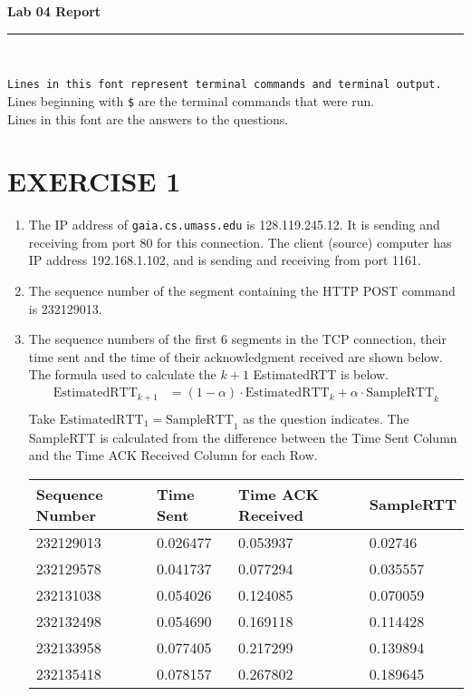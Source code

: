 \documentclass[a4paper,11pt]{article}
\newcommand{\ds}{\displaystyle}
\newcommand{\code}{\texttt}
\newcommand{\HRule}{\rule{\linewidth}{0.5mm}} %
\begin{document}
\begin{center}
	\LARGE \textbf{Lab 04 Report}
	\HRule\\
\end{center}


\noindent \code{Lines in this font represent terminal commands and terminal output.}\\
Lines beginning with \code{\$} are the terminal commands that were run.\\
Lines in this font are the answers to the questions.

\section{EXERCISE 1}
\begin{enumerate}[leftmargin=*]
	\item The IP address of \code{gaia.cs.umass.edu} is 128.119.245.12. It is sending and receiving from port 80 for this connection. The client (source) computer has IP address 192.168.1.102, and is sending and receiving from port 1161.
	\item The sequence number of the segment containing the HTTP POST command is 232129013.
	\item The sequence numbers of the first 6 segments in the TCP connection, their time sent and the time of their acknowledgment received are shown below. The formula used to calculate the $\ds{k+1}$ EstimatedRTT is below.
		\begin{align*}
			\text{EstimatedRTT}_{k+1} & = (1-\alpha)\cdot\text{EstimatedRTT}_{k} + \alpha\cdot\text{SampleRTT}_{k}\\
		\end{align*}
		Take $\ds{\text{EstimatedRTT}_{1} = \text{SampleRTT}_{1}}$ as the question indicates. The SampleRTT is calculated from the difference between the Time Sent Column and the Time ACK Received Column for each Row. 

		\begin{table}[!h]
		\centering
		\begin{tabular}{@{}llll@{}}
		\toprule
		Sequence Number & Time Sent & Time ACK Received & SampleRTT      \\ \midrule
		232129013       & 0.026477  & 0.053937          & 0.02746  \\
		232129578       & 0.041737  & 0.077294          & 0.035557 \\
		232131038       & 0.054026  & 0.124085          & 0.070059 \\
		232132498       & 0.054690  & 0.169118          & 0.114428 \\
		232133958       & 0.077405  & 0.217299          & 0.139894 \\
		232135418       & 0.078157  & 0.267802          & 0.189645 \\ \bottomrule
		\end{tabular}
		\end{table}


\end{enumerate}
\end{document}
